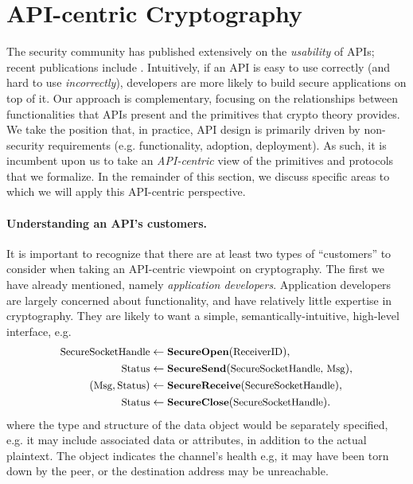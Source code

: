 \section{API-centric Cryptography}
The security community has published extensively on the \emph{usability} of
APIs; recent publications include \cite{ABF+,HHL+17,IKND16}.  Intuitively, if an
API is easy to use correctly (and hard to use \emph{incorrectly}),
developers are more likely to build secure applications on top of it.
%
Our approach is complementary, focusing on the relationships between
functionalities that APIs present and the primitives
that crypto theory provides. We take the position that, in practice, API design
is primarily driven by non-security requirements (e.g. functionality, adoption,
deployment).
%
As such, it is incumbent upon us to take an \emph{API-centric} view of the
primitives and protocols that we formalize.  In the remainder of this section,
we discuss specific areas to which we will apply this API-centric perspective.
%


\paragraph{Understanding an API's customers. }
It is important to recognize that there are at least two types of ``customers''
to consider when taking an API-centric viewpoint on cryptography. The first we
have already mentioned, namely \emph{application developers}. Application developers
are largely concerned about functionality, and have relatively little expertise
in cryptography. They are likely to want a simple, semantically-intuitive,
high-level interface, e.g.
\begin{align*}
\textrm{\small SecureSocketHandle}&\gets\textrm{\small\bf SecureOpen}(\textrm{\small ReceiverID}), \\
\textrm{\small Status}&\gets\textrm{\small\bf SecureSend}(\textrm{\small SecureSocketHandle, Msg}),\\
  (\textrm{\small Msg}, \textrm{\small Status}) &\gets\textrm{\small\bf SecureReceive}(\textrm{\small SecureSocketHandle}), \\
\textrm{\small Status}&\gets\textrm{\small\bf SecureClose}(\textrm{\small SecureSocketHandle}).
\end{align*}
%
where the type and structure of the data object  would be
separately specified, e.g. it may include associated data or attributes, in
addition to the actual plaintext.
%
The object  indicates the channel's health e.g, it may have been
torn down by the peer, or the destination address may be unreachable.

